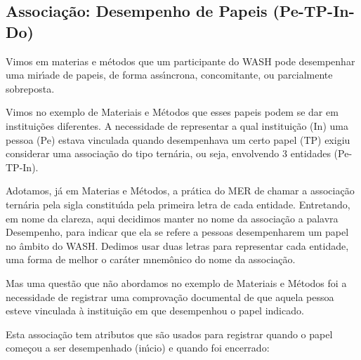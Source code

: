 \documentclass[
12pt,		%
openright,	%
twoside,  %
a4paper,			%
chapter=TITLE,		%
english,			%
french,				%
spanish,			%
brazil				%
]{USPSC-classe/USPSC}
\begin{document}
\subsection[Associa\c{c}\~ao: Desempenho de Papeis (Pe-TP-In-Do)]{Associa\c{c}\~ao: Desempenho de Papeis (Pe-TP-In-Do)}\label{Associa\c{c}\~ao: Desempenho de Papeis (Pe-TP-In-Do)}
Vimos em materias e m\'etodos que um participante do WASH pode desempenhar uma mir\'{\i}ade de papeis, de forma ass\'{\i}ncrona, concomitante, ou parcialmente sobreposta.










Vimos no exemplo de Materiais e M\'etodos que esses papeis podem se dar em institui\c{c}\~oes diferentes. A necessidade de representar a qual institui\c{c}\~ao (In) uma pessoa (Pe) estava vinculada quando desempenhava um certo papel (TP) exigiu considerar uma associa\c{c}\~ao do tipo tern\'aria, ou seja, envolvendo 3 entidades (Pe-TP-In).










Adotamos, j\'a em Materias e M\'etodos, a pr\'atica do MER de chamar a associa\c{c}\~ao tern\'aria pela sigla constitu\'{\i}da pela primeira letra de cada entidade. Entretando, em nome da clareza, aqui decidimos manter no nome da associa\c{c}\~ao a palavra \textquotedbl Desempenho\textquotedbl , para indicar que ela se refere a \textquotedbl pessoas desempenharem um papel no \^ambito do WASH\textquotedbl . Dedimos usar duas letras para representar cada entidade, uma forma de melhor o car\'ater mnem\^onico do nome da associa\c{c}\~ao.










Mas uma quest\~ao que n\~ao abordamos no exemplo de Materiais e M\'etodos foi a necessidade de registrar uma comprova\c{c}\~ao documental de que aquela pessoa esteve vinculada \`a institui\c{c}\~ao em que desempenhou o papel indicado.










Esta associa\c{c}\~ao tem atributos que s\~ao usados para registrar quando o papel come\c{c}ou a ser desempenhado (in\'{\i}cio) e quando foi encerrado:
\end{document}
